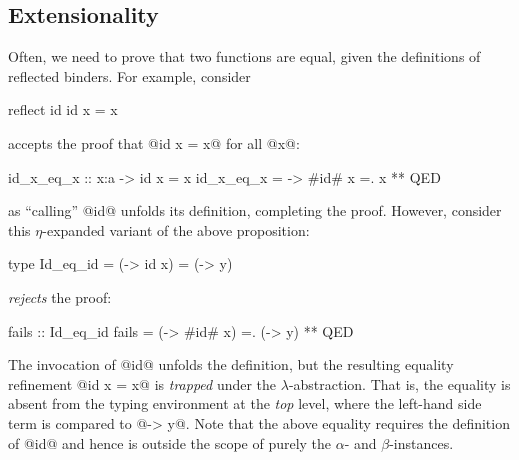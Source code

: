 
\subsection{Extensionality} \label{subsec:extensionality}

Often, we need to prove that two
functions are equal, given the
definitions of reflected binders.
%
For example, consider
%
\begin{code}
  reflect id
  id x = x
\end{code}
%
\toolname accepts the proof that
@id x = x@ for all @x@:
%
\begin{code}
  id_x_eq_x :: x:a -> {id x = x}
  id_x_eq_x = \x -> #id# x =. x ** QED
\end{code}
%
as ``calling'' @id@ unfolds its definition,
completing the proof.
%
However, consider this $\eta$-expanded variant of
the above proposition:
%
\begin{code}
  type Id_eq_id = {(\x -> id x) = (\y -> y)}
\end{code}
%
\toolname \emph{rejects} the proof:
%
\begin{code}
  fails :: Id_eq_id
  fails =  (\x -> #id# x) =. (\y -> y) ** QED
\end{code}
%
The invocation of @id@ unfolds the
definition, but the resulting equality
refinement @{id x = x}@ is \emph{trapped}
under the $\lambda$-abstraction.
%
That is, the equality is absent from the
typing environment at the \emph{top} level,
where the left-hand side term is compared to @\y -> y@.
%
Note that the above equality requires
the definition of @id@ and hence is
outside the scope of purely the
$\alpha$- and $\beta$-instances.

